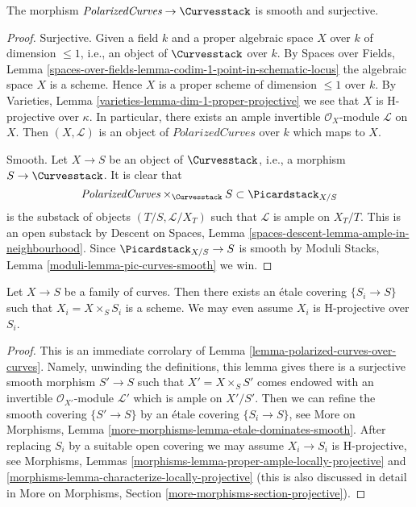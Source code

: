 \begin{lemma}
\label{lemma-polarized-curves-over-curves}
The morphism
$\textit{PolarizedCurves} \to \Curvesstack$
is smooth and surjective.
\end{lemma}

\begin{proof}
Surjective. Given a field $k$ and a proper algebraic space
$X$ over $k$ of dimension $\leq 1$, i.e., an object of $\Curvesstack$ over $k$.
By Spaces over Fields, Lemma
\ref{spaces-over-fields-lemma-codim-1-point-in-schematic-locus}
the algebraic space $X$ is a scheme. Hence $X$
is a proper scheme of dimension $\leq 1$ over $k$.
By Varieties, Lemma \ref{varieties-lemma-dim-1-proper-projective}
we see that $X$ is H-projective over $\kappa$.
In particular, there exists an ample invertible $\mathcal{O}_X$-module
$\mathcal{L}$ on $X$. Then $(X, \mathcal{L})$ is an object
of $\textit{PolarizedCurves}$ over
$k$ which maps to $X$.

\medskip\noindent
Smooth. Let $X \to S$ be an object of $\Curvesstack$, i.e., a
morphism $S \to \Curvesstack$. It is clear that
$$
\textit{PolarizedCurves}
\times_{\Curvesstack} S
\subset \Picardstack_{X/S}
$$
is the substack of objects $(T/S, \mathcal{L}/X_T)$ such that
$\mathcal{L}$ is ample on $X_T/T$. This is an open substack by
Descent on Spaces, Lemma \ref{spaces-descent-lemma-ample-in-neighbourhood}.
Since $\Picardstack_{X/S} \to S$ is smooth by
Moduli Stacks, Lemma \ref{moduli-lemma-pic-curves-smooth}
we win.
\end{proof}

\begin{lemma}
\label{lemma-etale-locally-scheme}
Let $X \to S$ be a family of curves.
Then there exists an \'etale covering $\{S_i \to S\}$
such that $X_i = X \times_S S_i$ is a scheme. We may even
assume $X_i$ is H-projective over $S_i$.
\end{lemma}

\begin{proof}
This is an immediate corrolary of
Lemma \ref{lemma-polarized-curves-over-curves}.
Namely, unwinding the definitions, this lemma gives there is a
surjective smooth morphism $S' \to S$ such that $X' = X \times_S S'$
comes endowed with an invertible $\mathcal{O}_{X'}$-module
$\mathcal{L}'$ which is ample on $X'/S'$.
Then we can refine the smooth covering $\{S' \to S\}$
by an \'etale covering $\{S_i \to S\}$, see
More on Morphisms, Lemma \ref{more-morphisms-lemma-etale-dominates-smooth}.
After replacing $S_i$ by a suitable open covering we may assume
$X_i \to S_i$ is H-projective, see
Morphisms, Lemmas \ref{morphisms-lemma-proper-ample-locally-projective} and
\ref{morphisms-lemma-characterize-locally-projective}
(this is also discussed in detail in
More on Morphisms, Section \ref{more-morphisms-section-projective}).
\end{proof}






